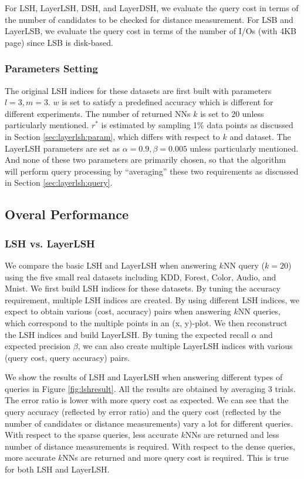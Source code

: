  For LSH, LayerLSH, DSH, and LayerDSH, we evaluate the query cost in terms of the number of candidates to be checked for distance measurement. For LSB and LayerLSB, we evaluate the query cost in terms of the number of I/Os (with 4KB page) since LSB is disk-based.


\subsubsection{Parameters Setting}

The original LSH indices for these datasets are first built with parameters $l=3,m=3$. $w$ is set to satisfy a predefined accuracy which is different for different experiments. The number of returned NNs $k$ is set to 20 unless particularly mentioned. $r^*$ is estimated by sampling 1\% data points as discussed in Section \ref{sec:layerlsh:param}, which differs with respect to $k$ and dataset. The LayerLSH parameters are set as $\alpha=0.9, \beta=0.005$ unless particularly mentioned. And none of these two parameters are primarily chosen, so that the algorithm will perform query processing by ``averaging'' these two requirements as discussed in Section \ref{sec:layerlsh:query}.

\subsection{Overal Performance}

\subsubsection{LSH vs. LayerLSH}

We compare the basic LSH and LayerLSH when answering $k$NN query ($k=20$) using the five small real datasets including KDD, Forest, Color, Audio, and Mnist. We first build LSH indices for these datasets. By tuning the accuracy requirement, multiple LSH indices are created. By using different LSH indices, we expect to obtain various (cost, accuracy) pairs when answering $k$NN queries, which correspond to the multiple points in an (x, y)-plot. We then reconstruct the LSH indices and build LayerLSH. By tuning the expected recall $\alpha$ and expected precision $\beta$, we can also create multiple LayerLSH indices with various (query cost, query accuracy) pairs.

We show the results of LSH and LayerLSH when answering different types of queries in Figure \ref{fig:lshresult}. All the results are obtained by averaging 3 trials. The error ratio is lower with more query cost as expected. We can see that the query accuracy (reflected by error ratio) and the query cost (reflected by the number of candidates or distance measurements) vary a lot for different queries. With respect to the sparse queries, less accurate $k$NNs are returned and less number of distance measurements is required. With respect to the dense queries, more accurate $k$NNs are returned and more query cost is required. This is true for both LSH and LayerLSH.

